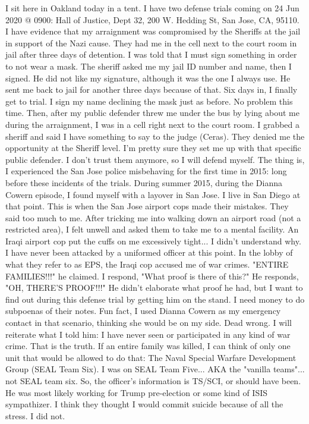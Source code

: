 \documentclass[a4paper]{arthur-letter}
\begin{document}
\begin{letter}
            I sit here in Oakland today in a tent. I have two defense trials coming on 24 Jun 2020 @ 0900: Hall of Justice, Dept 32, 200 W. Hedding St, San Jose, CA, 95110. I have evidence that my arraignment was compromised by the Sheriffs at the jail in support of the Nazi cause. They had me in the cell next to the court room in jail after three days of detention. I was told that I must sign something in order to not wear a mask. The sheriff asked me my jail ID number and name, then I signed. He did not like my signature, although it was the one I always use. He sent me back to jail for another three days because of that. Six days in, I finally get to trial. I sign my name declining the mask just as before. No problem this time. Then, after my public defender threw me under the bus by lying about me during the arraignment, I was in a cell right next to the court room. I grabbed a sheriff and said I have something to say to the judge (Ceras). They denied me the opportunity at the Sheriff level. I'm pretty sure they set me up with that specific public defender. I don't trust them anymore, so I will defend myself. The thing is, I experienced the San Jose police misbehaving for the first time in 2015: long before these incidents of the trials. During summer 2015, during the Dianna Cowern episode, I found myself with a layover in San Jose. I live in San Diego at that point. This is when the San Jose airport cops made their mistakes. They said too much to me. After tricking me into walking down an airport road (not a restricted area), I felt unwell and asked them to take me to a mental facility. An Iraqi airport cop put the cuffs on me excessively tight... I didn't understand why. I have never been attacked by a uniformed officer at this point. In the lobby of what they refer to as EPS, the Iraqi cop accused me of war crimes. "ENTIRE FAMILIES!!!" he claimed. I respond, "What proof is there of this?" He responds, "OH, THERE'S PROOF!!!" He didn't elaborate what proof he had, but I want to find out during this defense trial by getting him on the stand. I need money to do subpoenas of their notes. Fun fact, I used Dianna Cowern as my emergency contact in that scenario, thinking she would be on my side. Dead wrong. I will reiterate what I told him: I have never seen or participated in any kind of war crime. That is the truth. If an entire family was killed, I can think of only one unit that would be allowed to do that: The Naval Special Warfare Development Group (SEAL Team Six). I was on SEAL Team Five... AKA the "vanilla teams"... not SEAL team six. So, the officer's information is TS/SCI, or should have been. He was most likely working for Trump pre-election or some kind of ISIS sympathizer. I think they thought I would commit suicide because of all the stress. I did not. \\
            

\end{letter}
\end{document}

